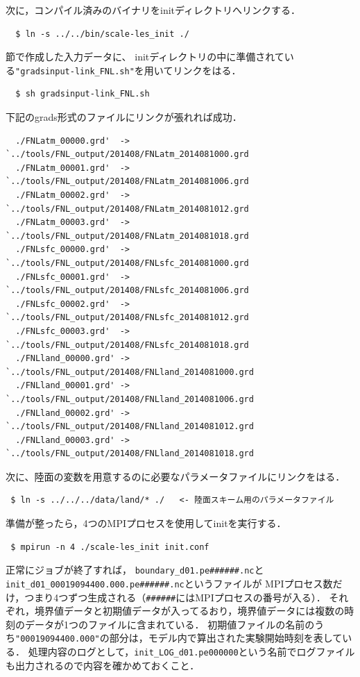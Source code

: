 次に，コンパイル済みのバイナリをinitディレクトリへリンクする．
\begin{verbatim}
  $ ln -s ../../bin/scale-les_init ./
\end{verbatim}
\label{sec:real_prep}節で作成した入力データに、
initディレクトリの中に準備されている\verb|"gradsinput-link_FNL.sh"|を用いてリンクをはる．
\begin{verbatim}
  $ sh gradsinput-link_FNL.sh
\end{verbatim}
下記のgrads形式のファイルにリンクが張れれば成功．
\begin{verbatim}
  ./FNLatm_00000.grd'  -> `../tools/FNL_output/201408/FNLatm_2014081000.grd
  ./FNLatm_00001.grd'  -> `../tools/FNL_output/201408/FNLatm_2014081006.grd
  ./FNLatm_00002.grd'  -> `../tools/FNL_output/201408/FNLatm_2014081012.grd
  ./FNLatm_00003.grd'  -> `../tools/FNL_output/201408/FNLatm_2014081018.grd
  ./FNLsfc_00000.grd'  -> `../tools/FNL_output/201408/FNLsfc_2014081000.grd
  ./FNLsfc_00001.grd'  -> `../tools/FNL_output/201408/FNLsfc_2014081006.grd
  ./FNLsfc_00002.grd'  -> `../tools/FNL_output/201408/FNLsfc_2014081012.grd
  ./FNLsfc_00003.grd'  -> `../tools/FNL_output/201408/FNLsfc_2014081018.grd
  ./FNLland_00000.grd' -> `../tools/FNL_output/201408/FNLland_2014081000.grd
  ./FNLland_00001.grd' -> `../tools/FNL_output/201408/FNLland_2014081006.grd
  ./FNLland_00002.grd' -> `../tools/FNL_output/201408/FNLland_2014081012.grd
  ./FNLland_00003.grd' -> `../tools/FNL_output/201408/FNLland_2014081018.grd
\end{verbatim}

次に、陸面の変数を用意するのに必要なパラメータファイルにリンクをはる．
\begin{verbatim}
 $ ln -s ../../../data/land/* ./   <- 陸面スキーム用のパラメータファイル
\end{verbatim}
準備が整ったら，4つのMPIプロセスを使用してinitを実行する．
\begin{verbatim}
 $ mpirun -n 4 ./scale-les_init init.conf
\end{verbatim}

正常にジョブが終了すれば，
\verb|boundary_d01.pe######.nc|と\verb|init_d01_00019094400.000.pe######.nc|というファイルが
MPIプロセス数だけ，つまり4つずつ生成される（\verb|######|にはMPIプロセスの番号が入る）．
それぞれ，境界値データと初期値データが入ってるおり，境界値データには複数の時刻のデータが1つのファイルに含まれている．
初期値ファイルの名前のうち\verb|"00019094400.000"|の部分は，モデル内で算出された実験開始時刻を表している．
処理内容のログとして，\verb|init_LOG_d01.pe000000|という名前でログファイルも出力されるので内容を確かめておくこと．


